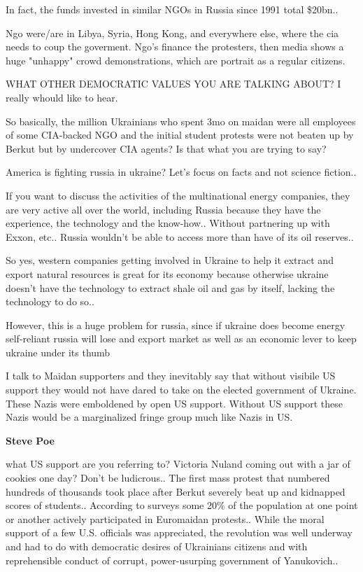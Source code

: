 \begin{itemize}
\begin{itemize}
In fact, the funds invested in similar NGOs in Russia since 1991 total \$20bn..


Ngo were/are in Libya, Syria, Hong Kong, and everywhere else, where the cia
needs to coup the goverment. Ngo's finance the protesters, then media shows a
huge "unhappy" crowd demonstrations, which are portrait as a regular citizens.

WHAT OTHER DEMOCRATIC VALUES YOU ARE TALKING ABOUT? I really whould like to
hear.


So basically, the million Ukrainians who spent 3mo on maidan were all employees
of some CIA-backed NGO and the initial student protests were not beaten up by
Berkut but by undercover CIA agents? Is that what you are trying to say?


America is fighting russia in ukraine? Let's focus on facts and not science
fiction..

If you want to discuss the activities of the multinational energy companies,
they are very active all over the world, including Russia because they have the
experience, the technology and the know-how.. Without partnering up with Exxon,
etc.. Russia wouldn't be able to access more than have of its oil reserves..

So yes, western companies getting involved in Ukraine to help it extract and
export natural resources is great for its economy because otherwise ukraine
doesn't have the technology to extract shale oil and gas by itself, lacking the
technology to do so..

However, this is a huge problem for russia, since if ukraine does become energy
self-reliant russia will lose and export market as well as an economic lever to
keep ukraine under its thumb


I talk to Maidan supporters and they inevitably say that without visibile US
support they would not have dared to take on the elected government of Ukraine.
These Nazis were emboldened by open US support. Without US support these Nazis
would be a marginalized fringe group much like Nazis in US.

\textbf{Steve Poe} 

what US support are you referring to? Victoria Nuland coming out with a jar of
cookies one day? Don't be ludicrous.. The first mass protest that numbered
hundreds of thousands took place after Berkut severely beat up and kidnapped
scores of students.. According to surveys some 20\% of the population at one
point or another actively participated in Euromaidan protests.. While the moral
support of a few U.S. officials was appreciated, the revolution was well
underway and had to do with democratic desires of Ukrainians citizens and with
reprehensible conduct of corrupt, power-usurping government of Yanukovich..


\end{itemize}
\end{itemize}
